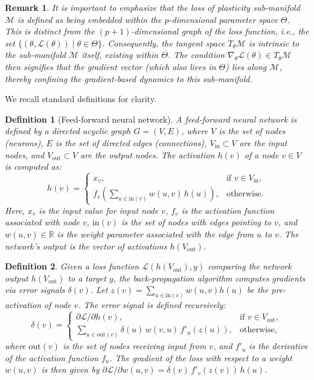 \documentclass{article}
\newcommand{\Loss}{\mathcal{L}}
\newcommand{\R}{\mathbb{R}}
\newtheorem{definition}{Definition}[section]
\newtheorem{remark}{Remark}[section]
\begin{document}
\begin{remark}
It is important to emphasize that the loss of plasticity sub-manifold $\mathcal{M}$ is defined as being embedded within the $p$-dimensional parameter space $\Theta$. This is distinct from the $(p+1)$-dimensional graph of the loss function, i.e., the set $\{(\theta, \mathcal{L}(\theta)) \mid \theta \in \Theta \}$. Consequently, the tangent space $T_\theta\mathcal{M}$ is intrinsic to the sub-manifold $\mathcal{M}$ itself, existing within $\Theta$. The condition $\nabla_\theta\mathcal{L}(\theta) \in T_\theta\mathcal{M}$ then signifies that the gradient vector (which also lives in $\Theta$) lies along $\mathcal{M}$, thereby confining the gradient-based dynamics to this sub-manifold.
\end{remark}

We recall standard definitions for clarity.

\begin{definition}[Feed-forward neural network]
A feed-forward neural network is defined by a directed acyclic graph $G=(V,E)$, where $V$ is the set of nodes (neurons), $E$ is the set of directed edges (connections), $V_{\text{in}} \subset V$ are the input nodes, and $V_{\text{out}} \subset V$ are the output nodes. The activation $h(v)$ of a node $v \in V$ is computed as:
\[
h(v)=
\begin{cases}
x_v, & \text{if } v\in V_{\text{in}},\\
f_v\!\left(\sum_{u\!\in\!\mathrm{in}(v)}w(u,v)\,h(u)\right), &\text{otherwise}.
\end{cases}
\]
Here, $x_v$ is the input value for input node $v$, $f_v$ is the activation function associated with node $v$, $\mathrm{in}(v)$ is the set of nodes with edges pointing to $v$, and $w(u,v) \in \R$ is the weight parameter associated with the edge from $u$ to $v$. The network's output is the vector of activations $h(V_{\text{out}})$.
\end{definition}

\begin{definition}
Given a loss function $\Loss(h(V_{\text{out}}),y)$ comparing the network output $h(V_{\text{out}})$ to a target $y$, the back-propagation algorithm computes gradients via error signals $\delta(v)$. Let $z(v) = \sum_{u\in\mathrm{in}(v)}w(u,v)h(u)$ be the pre-activation of node $v$. The error signal is defined recursively:
\[
\delta(v)=
\begin{cases}
\partial\Loss/\partial h(v), & \text{if } v\in V_{\text{out}},\\[4pt]
\displaystyle\sum_{u\in\mathrm{out}(v)}\delta(u)\,w(v,u)\,f'_u(z(u)), &\text{otherwise},
\end{cases}
\]
where $\mathrm{out}(v)$ is the set of nodes receiving input from $v$, and $f'_u$ is the derivative of the activation function $f_u$. The gradient of the loss with respect to a weight $w(u,v)$ is then given by $\partial\Loss/\partial w(u,v)=\delta(v)\,f'_v(z(v))\,h(u)$.\qedhere
\end{definition}
\end{document}
